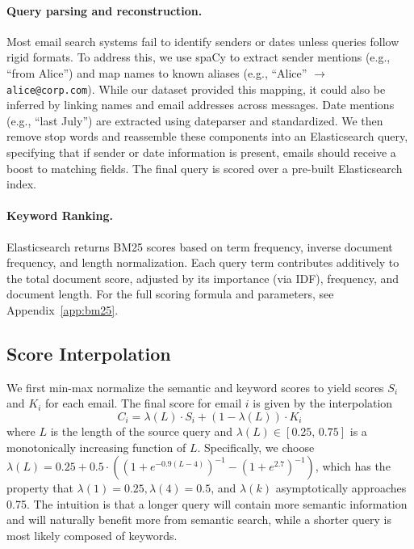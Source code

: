 \documentclass{article}
\begin{document}
\paragraph{Query parsing and reconstruction.}
Most email search systems fail to identify senders or dates unless queries follow rigid formats. To address this, we use spaCy to extract sender mentions (e.g., “from Alice”) and map names to known aliases (e.g., “Alice” $\rightarrow$ \texttt{alice@corp.com}). While our dataset provided this mapping, it could also be inferred by linking names and email addresses across messages. Date mentions (e.g., “last July”) are extracted using dateparser and standardized. We then remove stop words and reassemble these components into an Elasticsearch query, specifying that if sender or date information is present, emails should receive a boost to matching fields. The final query is scored over a pre-built Elasticsearch index.

\paragraph{Keyword Ranking.}

Elasticsearch returns BM25 scores based on term frequency, inverse document frequency, and length normalization. Each query term contributes additively to the total document score, adjusted by its importance (via IDF), frequency, and document length. For the full scoring formula and parameters, see Appendix~\ref{app:bm25}.

\subsection{Score Interpolation}

We first min-max normalize the semantic and keyword scores to yield scores $S_i$ and $K_i$ for each email. The final score for email $i$ is given by the interpolation
\begin{equation}
  C_i = \lambda(L) \cdot S_i + (1 - \lambda(L)) \cdot K_i
\end{equation}
where $L$ is the length of the source query and
$\lambda(L)\!\in[0.25,\,0.75]$ is a monotonically increasing function of
$L$. Specifically, we choose $\lambda(L) = 0.25 + 0.5 \cdot \left( (1 + e^{-0.9(L - 4)})^{-1} - (1 + e^{2.7})^{-1} \right)$, which has the property that $\lambda(1) = 0.25, \lambda(4) = 0.5$, and $\lambda(k)$ asymptotically approaches 0.75. The intuition is that a longer query will contain more semantic information and will naturally benefit more from semantic search, while a shorter query is most likely composed of keywords.
\end{document}
